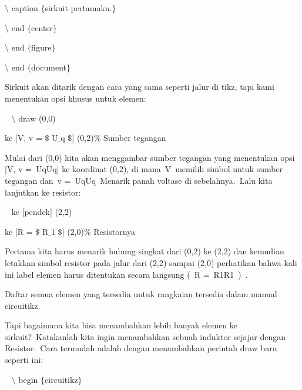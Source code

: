 \noindent 
 $\setminus$ caption $ \{ $sirkuit pertamaku.$ \} $
\par


\noindent 
 $\setminus$ end $ \{ $center$ \} $
\par


\noindent 
 $\setminus$ end $ \{ $figure$ \} $
\par


\noindent 
 $\setminus$ end $ \{ $document$ \} $ 
\par


\noindent 
Sirkuit akan ditarik dengan cara yang sama seperti jalur di tikz, tapi kami menentukan opsi khusus untuk elemen:
\par


\noindent 
~ $\setminus$ draw (0,0)
\par


\noindent 
 ke [V, v = $\$$ U$ \_ $q $\$$] (0,2)$\%$ Sumber tegangan 
\par


\noindent 
Mulai dari (0,0) kita akan menggambar sumber tegangan yang menentukan opsi [V, v = UqUq] ke koordinat (0,2), di mana V memilih simbol untuk sumber tegangan dan v = UqUq Menarik panah voltase di sebelahnya. Lalu kita lanjutkan ke resistor:
\par


\noindent 
~ ke [pendek] (2,2)
\par


\noindent 
 ke [R = $\$$ R$ \_ $1 $\$$] (2,0)$\%$ Resistornya 
\par


\noindent 
Pertama kita harus menarik hubung singkat dari (0,2) ke (2,2) dan kemudian letakkan simbol resistor pada jalur dari (2,2) sampai (2,0) perhatikan bahwa kali ini label elemen harus ditentukan secara langsung ( R = R1R1 ) .
\par


\noindent 
Daftar semua elemen yang tersedia untuk rangkaian tersedia dalam manual circuitikz.
\par


\noindent 
Tapi bagaimana kita bisa menambahkan lebih banyak elemen ke sirkuit? Katakanlah kita ingin menambahkan sebuah induktor sejajar dengan Resistor. Cara termudah adalah dengan menambahkan perintah draw baru seperti ini:
\par


\noindent 
~ $\setminus$ begin $ \{ $circuitikz$ \} $
\par


